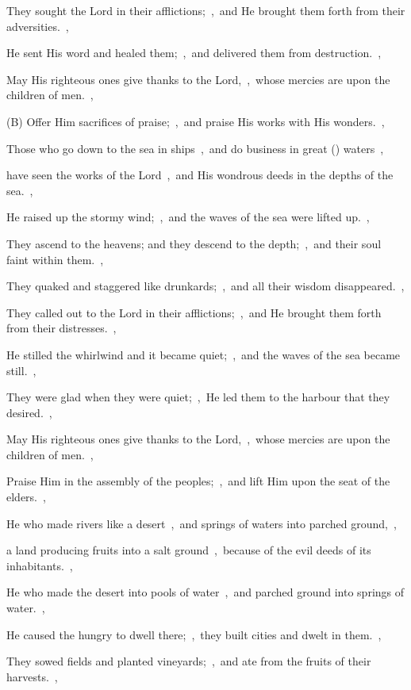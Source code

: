 \documentclass[12pt,twoside,a5paper]{article}
\begin{document}
\begin{normalparskip}
  They sought the Lord in their afflictions;~\sep\ and He brought them forth from their adversities.~\sep

  He sent His word and healed them;~\sep\ and delivered them from destruction.~\sep

  May His righteous ones give thanks to the Lord,~\sep\ whose mercies are upon the children of men.~\sep

  (B) Offer Him sacrifices of praise;~\sep\ and praise His works with His wonders.~\sep

  Those who go down to the sea in ships~\sep\ and do business in great () waters~\sep

  have seen the works of the Lord~\sep\ and His wondrous deeds in the depths of the sea.~\sep

  He raised up the stormy wind;~\sep\ and the waves of the sea were lifted up.~\sep

  They ascend to the heavens; and they descend to the depth;~\sep\ and their soul faint within them.~\sep

  They quaked and staggered like drunkards;~\sep\ and all their wisdom disappeared.~\sep

  They called out to the Lord in their afflictions;~\sep\ and He brought them forth from their distresses.~\sep

  He stilled the whirlwind and it became quiet;~\sep\ and the waves of the sea became still.~\sep

  They were glad when they were quiet;~\sep\ He led them to the harbour that they desired.~\sep

  May His righteous ones give thanks to the Lord,~\sep\ whose mercies are upon the children of men.~\sep

  Praise Him in the assembly of the peoples;~\sep\ and lift Him upon the seat of the elders.~\sep

  He who made rivers like a desert~\sep\ and springs of waters into parched ground,~\sep

  a land producing fruits into a salt ground~\sep\ because of the evil deeds of its inhabitants.~\sep

  He who made the desert into pools of water~\sep\ and parched ground into springs of water.~\sep

  He caused the hungry to dwell there;~\sep\ they built cities and dwelt in them.~\sep

  They sowed fields and planted vineyards;~\sep\ and ate from the fruits of their harvests.~\sep


\end{normalparskip}
\end{document}
